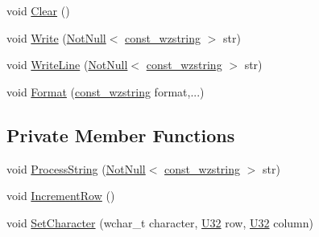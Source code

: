 \begin{DoxyCompactItemize}
\item 
void \mbox{\hyperlink{classmage_1_1script_1_1_text_console_script_a274764deea9f02ec77515680456548d6}{Clear}} ()
\item 
void \mbox{\hyperlink{classmage_1_1script_1_1_text_console_script_a46610edcf7a1707476b87ad64f1ee68d}{Write}} (\mbox{\hyperlink{namespacemage_a8769f9d670d6b585ea306cb1062af94b}{Not\+Null}}$<$ \mbox{\hyperlink{namespacemage_ac409e0f2a22292a3a4cd42742994fbf0}{const\+\_\+wzstring}} $>$ str)
\item 
void \mbox{\hyperlink{classmage_1_1script_1_1_text_console_script_ac8f0361bc1d703b56f1d8be43a32f0ae}{Write\+Line}} (\mbox{\hyperlink{namespacemage_a8769f9d670d6b585ea306cb1062af94b}{Not\+Null}}$<$ \mbox{\hyperlink{namespacemage_ac409e0f2a22292a3a4cd42742994fbf0}{const\+\_\+wzstring}} $>$ str)
\item 
void \mbox{\hyperlink{classmage_1_1script_1_1_text_console_script_ac5a8c33c93acf289ac1cebf2ec9e21d7}{Format}} (\mbox{\hyperlink{namespacemage_ac409e0f2a22292a3a4cd42742994fbf0}{const\+\_\+wzstring}} format,...)
\end{DoxyCompactItemize}
\subsection*{Private Member Functions}
\begin{DoxyCompactItemize}
\item 
void \mbox{\hyperlink{classmage_1_1script_1_1_text_console_script_a9c990e0256f01eb4cc1622bf346f32a5}{Process\+String}} (\mbox{\hyperlink{namespacemage_a8769f9d670d6b585ea306cb1062af94b}{Not\+Null}}$<$ \mbox{\hyperlink{namespacemage_ac409e0f2a22292a3a4cd42742994fbf0}{const\+\_\+wzstring}} $>$ str)
\item 
void \mbox{\hyperlink{classmage_1_1script_1_1_text_console_script_a3d4cba4fd8a2733933a7a444c6beaf1a}{Increment\+Row}} ()
\item 
void \mbox{\hyperlink{classmage_1_1script_1_1_text_console_script_a18bdee79ee6f53e28f90b607c36c8188}{Set\+Character}} (wchar\+\_\+t character, \mbox{\hyperlink{namespacemage_aa5d6eaabaac3cdd01873d6a3d27e90f3}{U32}} row, \mbox{\hyperlink{namespacemage_aa5d6eaabaac3cdd01873d6a3d27e90f3}{U32}} column)
\end{DoxyCompactItemize}
